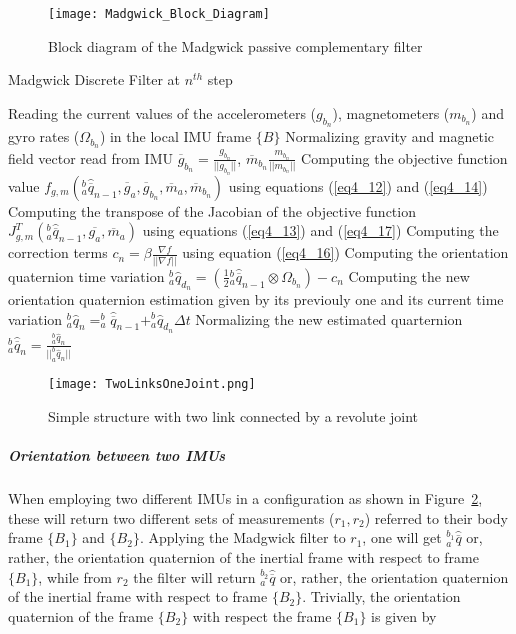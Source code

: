 \begin{figure}[t]
\texttt{[image: Madgwick\_Block\_Diagram]}
\caption{Block diagram of the Madgwick passive complementary filter}
\label{BlockDiagram}
\end{figure}

\begin{algorithm}
\caption{Madgwick Discrete Filter at $n^{th}$ step}
\begin{algorithmic}[1]
\label{MadgwickAlg}
\STATE Reading the current values of the accelerometers ($g_{b_n}$), magnetometers ($m_{b_n}$) and gyro rates ($\Omega_{b_n}$) in the local IMU frame $\{B\}$
\STATE Normalizing gravity and magnetic field vector read from IMU $\overline{g}_{b_n} = \frac{g_{b_n}}{\vert \vert g_{b_n} \vert \vert}$, $\overline{m}_{b_n} \frac{m_{b_n}}{\vert \vert m_{b_n} \vert \vert}$
\STATE Computing the objective function value $f_{g,m}({^b_a\hat{\overline{q}}_{n-1}},\overline{g}_a,\overline{g}_{b_n},\overline{m}_a,\overline{m}_{b_n})$ using equations (\ref{eq4_12}) and (\ref{eq4_14})
\STATE Computing the transpose of the Jacobian of the objective function $J^T_{g,m}(^b_a\hat{\overline{q}}_{n-1},\overline{g_a},\overline{m}_a)$ using equations (\ref{eq4_13}) and (\ref{eq4_17})
\STATE Computing the correction terms $c_n =  \beta \frac{\nabla f}{\vert \vert \nabla f \vert \vert}$ using equation (\ref{eq4_16})
\STATE Computing the orientation quaternion time variation $^b_a \hat{q}_{d_n} =  (\frac{1}{2} {^b_a\hat{\overline{q}}_{n-1}} \otimes \Omega_{b_n}) - c_n$
\STATE Computing the new orientation quaternion estimation given by its previouly one and its current time variation $^b_a \hat{q}_n = ^b_a\hat{\overline{q}}_{n-1} + ^b_a \hat{q}_{d_n} \Delta t$
\STATE Normalizing the new estimated quarternion $^b_a \hat{\overline{q}}_n = \frac{^b_a \hat{q}_n}{\vert \vert ^b_a \hat{q}_n \vert \vert}$
\end{algorithmic}
\end{algorithm}

\begin{figure}[t]
\centering
\texttt{[image: TwoLinksOneJoint.png]}
\caption{Simple structure with two link connected by a revolute joint}
\label{TwoLinksOneJoint}
\end{figure}

\subparagraph{Orientation between two IMUs}

When employing two different IMUs in a configuration as shown in Figure~\ref{TwoLinksOneJoint}, these will return two different sets of measurements ($r_1,r_2$) referred to their body frame $\{ B_1 \}$ and $\{ B_2 \}$. Applying the Madgwick filter to $r_1$, one will get $^{b{_1}}_a \hat{\overline{q}}$ or, rather, the orientation quaternion of the inertial frame with respect to frame $\{ B_1 \}$, while from $r_2$ the filter will return $^{b{_2}}_a \hat{\overline{q}}$ or, rather, the orientation quaternion of the inertial frame with respect to frame $\{ B_2 \}$. Trivially, the orientation quaternion of the frame $\{ B_2 \}$ with respect the frame $\{ B_1 \}$ is given by

